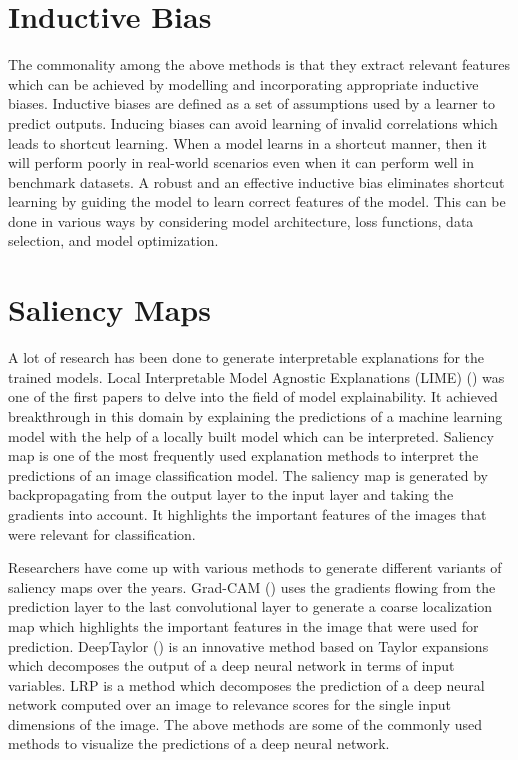 \section{Inductive Bias}
The commonality among the above methods is that they extract relevant features which can be achieved by modelling and incorporating appropriate inductive biases. Inductive biases are defined as a set of assumptions used by a learner to predict outputs. Inducing biases can avoid learning of invalid correlations which leads to shortcut learning. When a model learns in a shortcut manner, then it will perform poorly in real-world scenarios even when it can perform well in benchmark datasets. A robust and an effective inductive bias eliminates shortcut learning by guiding the model to learn correct features of the model. This can be done in various ways by considering model architecture, loss functions, data selection, and model optimization.

\section{Saliency Maps}

A lot of research has been done to generate interpretable explanations for the trained models. Local Interpretable Model Agnostic Explanations (LIME) (\cite{ribeiro2016why}) was one of the first papers to delve into the field of model explainability. It achieved breakthrough in this domain by explaining the predictions of a machine learning model with the help of a locally built model which can be interpreted. Saliency map is one of the most frequently used explanation methods to interpret the predictions of an image classification model. The saliency map is generated by backpropagating from the output layer to the input layer and taking the gradients into account. It highlights the important features of the images that were relevant for classification.

Researchers have come up with various methods to generate different variants of saliency maps over the years. Grad-CAM (\cite{selvaraju2017grad}) uses the gradients flowing from the prediction layer to the last convolutional layer to generate a coarse localization map which highlights the important features in the image that were used for prediction. DeepTaylor (\cite{montavon2017explaining}) is an innovative method based on Taylor expansions which decomposes the output of a deep neural network in terms of input variables. LRP \cite{binder2016layer} is a method which decomposes the prediction of a deep neural network computed over an image to relevance scores for the single input dimensions of the image. The above methods are some of the commonly used methods to visualize the predictions of a deep neural network.

